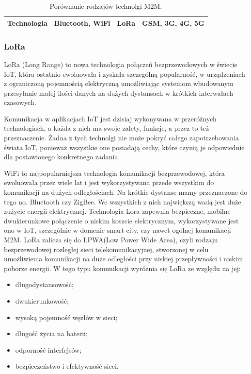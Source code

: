 \begin{table}[!htbp]
{\begin{tabular}{|l|l|l|l|}
  \textbf{Technologia} & Bluetooth, WiFi                                                                                                   & LoRa                                                                                                & GSM, 3G, 4G, 5G                                                                                                 \\ \hline
  \end{tabular}%
  }
  \caption{Porównanie rodzajów technolgi M2M.\cite{LoRa-article}}
\end{table}

\subsubsection{LoRa}
\hspace{1cm}LoRa (Long Range) to nowa technologia połączeń bezprzewodowych w świecie IoT, która ostatnio ewoluowała i zyskała szczególną popularność, w urządzeniach z ograniczoną pojemnością elektryczną umożliwiając systemom wbudowanym przesyłanie małej ilości danych na dużych dystansach w krótkich interwałach czasowych.

\hspace{1cm}Komunikacja w aplikacjach IoT jest dzisiaj wykonywana w przeróżnych technologiach, a każda z nich ma swoje zalety, funkcje, a przez to też przeznaczenie. Żadna z tych technolgi nie może pokryć całego zapotrzebowania świata IoT, ponieważ wszystkie one posiadają cechy, które czynią je odpowiednie dla postawionego konkretnego zadania.

\hspace{1cm}WiFi to najpopularniejsza technologia komunikacji bezprzewodowej, która ewoluowała przez wiele lat i jest wykorzystywana przede wszystkim do komunikacji na dużych
odległościach. Na krótkie dystanse mamy przeznaczone do tego no. Bluetooth czy ZigBee. We wszystkich z nich największą wadą jest duże zużycie energii elektrycznej. Technologia Lora zapewnia bezpieczne, mobilne dwukierunkowe połączenie o niskim koszcie elektrycznym, wykorzystywane jest ono w IoT, szczególnie w domenie smart city, czy nawet ogólnej komunikacji M2M. LoRa zalicza się do LPWA(Low Power Wide Area), czyli rodzaju bezprzewodowej rozległej sieci telekomunikacyjnej, stworzonej w celu umożliwienia komunikacji na duże odległości przy niskiej przepływności i niskim poborze energii. \cite{LPWA-wiki} W tego typu komunikacji wyróżnia się LoRa ze względu na jej:
\begin{itemize}
  \item długodystansowość;
  \item dwukierunkowość;
  \item wysoką pojemność węzłów w sieci;
  \item długość życia na baterii;
  \item odporność interfejsów;
  \item bezpieczeństwo i efektywność sieci. \cite{LoRa-article}
\end{itemize}


